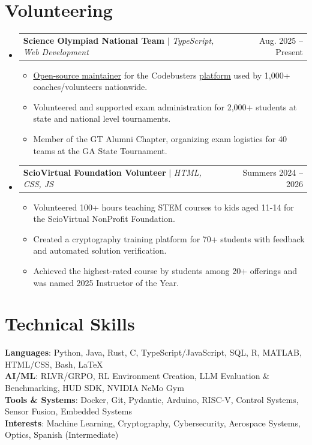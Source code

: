 \documentclass[letterpaper,11pt]{article}
\makeatletter
\newcommand{\resumeItem}[1]{
  \item[--]\small{
    {#1 \vspace{-2pt}}
  }
}
\newcommand{\resumeProjectHeading}[2]{
    \item
    \begin{tabular*}{0.97\textwidth}{l@{\extracolsep{\fill}}r}
      \small#1 & #2 \\
    \end{tabular*}\vspace{-7pt}
}
\newcommand{\resumeSubHeadingListStart}{\begin{itemize}[leftmargin=0.15in, label={}]}
\newcommand{\resumeSubHeadingListEnd}{\end{itemize}}
\newcommand{\resumeItemListStart}{\begin{itemize}}
\newcommand{\resumeItemListEnd}{\end{itemize}\vspace{-5pt}}
\makeatother
\begin{document}
\section{Volunteering}
    \resumeSubHeadingListStart
      \resumeProjectHeading
          {\textbf{Science Olympiad National Team} $|$ \emph{TypeScript, Web Development}}{Aug. 2025 -- Present}
          \resumeItemListStart
            \resumeItem{\href{https://github.com/toebes/ciphers}{\underline{Open-source maintainer}} for the Codebusters \href{https://toebes.com/codebusters/}{\underline{platform}} used by 1,000+ coaches/volunteers nationwide.}
            \resumeItem{Volunteered and supported exam administration for 2,000+ students at state and national level tournaments.}
            \resumeItem{Member of the GT Alumni Chapter, organizing exam logistics for 40 teams at the GA State Tournament.}
          \resumeItemListEnd
      \resumeProjectHeading{\textbf{ScioVirtual Foundation Volunteer} $|$ \emph{HTML, CSS, JS}}{Summers 2024 -- 2026}
      \resumeItemListStart
        \resumeItem{Volunteered 100+ hours teaching STEM courses to kids aged 11-14 for the ScioVirtual NonProfit Foundation.}
        \resumeItem{Created a cryptography training platform for 70+ students with feedback and automated solution verification.}
        \resumeItem{Achieved the highest-rated course by students among 20+ offerings and was named 2025 Instructor of the Year.}
\resumeItemListEnd
\resumeSubHeadingListEnd
%
\section{Technical Skills}
 \begin{itemize}[leftmargin=0.15in, label={}]
    \small{\item{
     \textbf{Languages}{: Python, Java, Rust, C, TypeScript/JavaScript, SQL, R, MATLAB, HTML/CSS, Bash, \LaTeX} \\
     \textbf{AI/ML}{: RLVR/GRPO, RL Environment Creation, LLM Evaluation \& Benchmarking, HUD SDK, NVIDIA NeMo Gym} \\
     \textbf{Tools \& Systems}{: Docker, Git, Pydantic, Arduino, RISC-V, Control Systems, Sensor Fusion, Embedded Systems} \\
     \textbf{Interests}{: Machine Learning, Cryptography, Cybersecurity, Aerospace Systems, Optics, Spanish (Intermediate)}
    }}
 \end{itemize}

 
\end{document}
